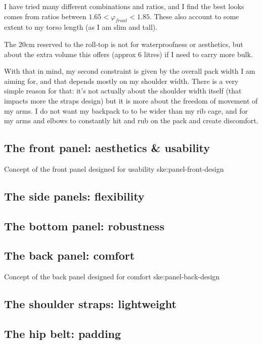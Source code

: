 I have tried many different combinations and ratios, and I find the best looks comes from ratios between $1.65 < \varphi_{front} < 1.85$. These also account to some extent to my torso length (as I am slim and tall).

\begin{note}
  The 20cm reserved to the roll-top is not for waterproofness or aesthetics, but about the extra volume this offers (approx 6 litres) if I need to carry more bulk.
\end{note}

With that in mind, my second constraint is given by the overall pack width I am aiming for, and that depends mostly on my shoulder width. There is a very simple reason for that: it's not actually about the shoulder width itself (that impacts more the straps design) but it is more about the freedom of movement of my arms. I do not want my backpack to to be wider than my rib cage, and for my arms and elbows to constantly hit and rub on the pack and create discomfort.

\subsection{The front panel: aesthetics \& usability}

{Concept of the front panel designed for usability}
{ske:panel-front-design}

\subsection{The side panels: flexibility}
\subsection{The bottom panel: robustness}
\subsection{The back panel: comfort}

{Concept of the back panel designed for comfort}
{ske:panel-back-design}

\subsection{The shoulder straps: lightweight}
\subsection{The hip belt: padding}
